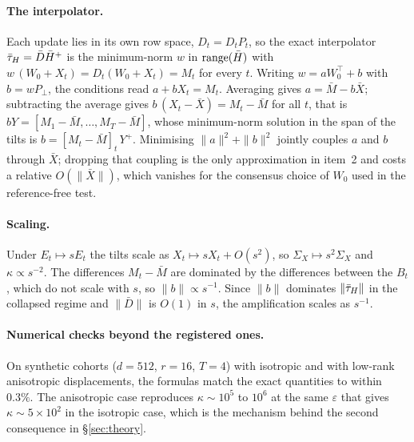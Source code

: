 \paragraph{The interpolator.} Each update lies in its own row space,
$D_t = D_tP_t$, so the exact interpolator $\bar{\tau}_H = \bar D \bar H^{+}$ is the
minimum-norm $w$ in $\operatorname{range}(\bar H)$ with $w\,(W_0 + X_t) = D_t(W_0 + X_t)
= M_t$ for every $t$. Writing $w = aW_0^\top + b$ with $b = wP_\perp$, the
conditions read $a + bX_t = M_t$. Averaging gives $a = \bar M - b\bar X$;
subtracting the average gives $b\,(X_t - \bar X) = M_t - \bar M$ for all $t$,
that is $bY = [M_1 - \bar M, \dots, M_T - \bar M]$, whose minimum-norm solution
in the span of the tilts is $b = [M_t - \bar M]_t\,Y^{+}$. Minimising
$\|a\|^2 + \|b\|^2$ jointly couples $a$ and $b$ through $\bar X$; dropping that
coupling is the only approximation in item~2 and costs a relative
$O(\|\bar X\|)$, which vanishes for the consensus choice of $W_0$ used in the
reference-free test.

\paragraph{Scaling.} Under $E_t \mapsto sE_t$ the tilts scale as
$X_t \mapsto sX_t + O(s^2)$, so $\Sigma_X \mapsto s^2\Sigma_X$ and
$\kappa \propto s^{-2}$. The differences $M_t - \bar M$ are dominated by the
differences between the $B_t$, which do not scale with $s$, so
$\|b\| \propto s^{-1}$. Since $\|b\|$ dominates $\|\bar{\tau}_H\|$ in the collapsed
regime and $\|\bar D\|$ is $O(1)$ in $s$, the amplification scales as
$s^{-1}$.

\paragraph{Numerical checks beyond the registered ones.} On synthetic cohorts
($d = 512$, $r = 16$, $T = 4$) with isotropic and with low-rank anisotropic
displacements, the formulas match the exact quantities to within $0.3\%$. The
anisotropic case reproduces $\kappa \sim 10^{5}$ to $10^{6}$ at the same
$\varepsilon$ that gives $\kappa \sim 5\times10^{2}$ in the isotropic case,
which is the mechanism behind the second consequence in \S\ref{sec:theory}.
